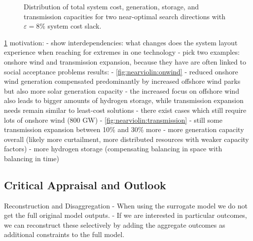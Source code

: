 \begin{figure}
    \noindent{}
    \caption{
      Distribution of total system cost, generation, storage, and transmission capacities
      for two near-optimal search directions with $\varepsilon=8\%$ system cost slack.
    }
    \label{fig:nearviolin}
\end{figure}

\cref{fig:nearviolin}
motivation:
- show interdependencies: what changes does the system layout experience when reaching for extremes in one technology
- pick two examples: onshore wind and transmission expansion, because they have are often linked to social acceptance problems
results:
- \cref{fig:nearviolin:onwind}
  - reduced onshore wind generation compensated predominantly by increased offshore wind parks but also more solar generation capacity
  - the increased focus on offshore wind also leads to bigger amounts of hydrogen storage, while transmission expansion needs remain similar to least-cost solutions
  - there exist cases which still require lots of onshore wind (800 GW)
- \cref{fig:nearviolin:transmission}
  - still some transmission expansion between 10\% and 30\% more
  - more generation capacity overall (likely more curtailment, more distributed resources with weaker capacity factors)
  - more hydrogen storage (compensating balancing in space with balancing in time)

\subsection{Critical Appraisal and Outlook}

Reconstruction and Disaggregation
- When using the surrogate model we do not get the full original model outputs.
- If we are interested in particular outcomes, we can reconstruct these selectively
by adding the aggregate outcomes as additional constraints to the full model.

